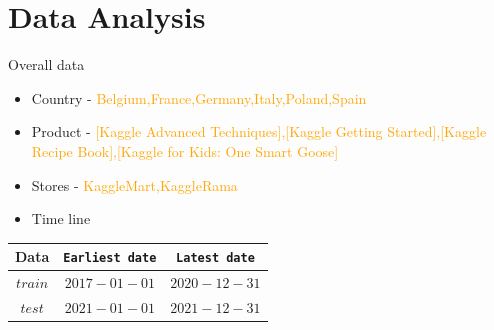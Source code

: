 \documentclass[
 size=14pt,
 paper=smartboard,  %
 mode=present, 		%
 display=slides, 	%
 style=tuliplab,  	%
 pauseslide,
 fleqn,leqno]{powerdot}
\begin{document}
\section{Data Analysis}





\begin{slide}[toc=,bm=]{Overall data}

\begin{itemize}
\item
Country - \textcolor{orange} {Belgium,France,Germany,Italy,Poland,Spain}
\end{itemize}

\begin{itemize}
	\item
	Product - \textcolor{orange} {[Kaggle Advanced Techniques],[Kaggle Getting Started],[Kaggle Recipe Book],[Kaggle for Kids: One Smart Goose]}
\end{itemize}

\begin{itemize}
	\item
	Stores - \textcolor{orange} {KaggleMart,KaggleRama}
\end{itemize}

\begin{itemize}
	\item
	Time line
\end{itemize}

\begin{center}
	\begin{tabular}{c| c |c }
		\toprule
		Data & \texttt{Earliest date}  & \texttt{Latest date} \\
		\midrule
		$train$
		&  {$2017-01-01$} &  {$2020-12-31$} \\
		$test$
		&  {$2021-01-01$} &  {$2021-12-31$}  \\
		\bottomrule
	\end{tabular}
\end{center}


\end{slide}
\end{document}

